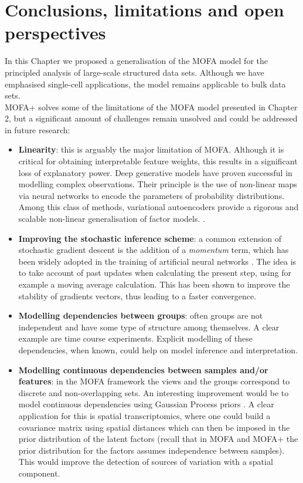 \section{Conclusions, limitations and open perspectives}

In this Chapter we proposed a generalisation of the MOFA model for the principled analysis of large-scale structured data sets. Although we have emphasised single-cell applications, the model remains applicable to bulk data sets.\\
MOFA+ solves some of the limitations of the MOFA model presented in Chapter 2, but a significant amount of challenges remain unsolved and could be addressed in future research:

\begin{itemize}
	\item \textbf{Linearity}: this is arguably the major limitation of MOFA. Although it is critical for obtaining interpretable feature weights, this results in a significant loss of explanatory power. Deep generative models have proven successful in modelling complex observations. Their principle is the use of non-linear maps via neural networks to encode the parameters of probability distributions. Among this class of methods, variational autoencoders provide a rigorous and scalable non-linear generalisation of factor models. \cite{Ainsworth2018}.

	\item \textbf{Improving the stochastic inference scheme}: a common extension of stochastic gradient descent is the addition of a \textit{momentum} term, which has been widely adopted in the training of artificial neural networks \cite{Zeiler2012,Ning1999}. The idea is to take account of past updates when calculating the present step, using for example a moving average calculation. This has been shown to improve the stability of gradients vectors, thus leading to a faster convergence.

	\item \textbf{Modelling dependencies between groups}: often groups are not independent and have some type of structure among themselves. A clear example are time course experiments. Explicit modelling of these dependencies, when known, could help on model inference and interpretation.

	\item \textbf{Modelling continuous dependencies between samples and/or features}: in the MOFA framework the views and the groups correspond to discrete and non-overlapping sets. An interesting improvement would be to model continuous dependencies using Gaussian Process priors \cite{Casale2018}. A clear application for this is spatial transcriptomics, where one could build a covariance matrix using spatial distances which can then be imposed in the prior distribution of the latent factors (recall that in MOFA and MOFA+ the prior distribution for the factors assumes independence between samples). This would improve the detection of sources of variation with a spatial component.
\end{itemize}